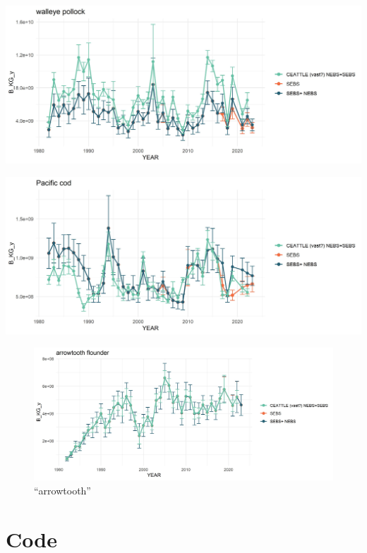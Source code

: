 \documentclass[
]{article}
\begin{document}
\includegraphics{figs/plk_srvy.jpg}

\includegraphics{figs/pcod_srvy.jpg}

\begin{figure}
\centering
\includegraphics{figs/atf_srvy.jpg}
\caption{``arrowtooth''}
\end{figure}

\hypertarget{code}{%
\section{Code}\label{code}}
\end{document}
